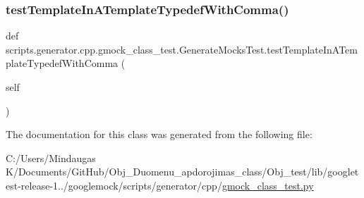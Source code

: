 \subsubsection{\texorpdfstring{testTemplateInATemplateTypedefWithComma()}{testTemplateInATemplateTypedefWithComma()}}
{\footnotesize\ttfamily def scripts.\+generator.\+cpp.\+gmock\+\_\+class\+\_\+test.\+Generate\+Mocks\+Test.\+test\+Template\+In\+A\+Template\+Typedef\+With\+Comma (\begin{DoxyParamCaption}\item[{}]{self }\end{DoxyParamCaption})}



The documentation for this class was generated from the following file\+:\begin{DoxyCompactItemize}
\item 
C\+:/\+Users/\+Mindaugas K/\+Documents/\+Git\+Hub/\+Obj\+\_\+\+Duomenu\+\_\+apdorojimas\+\_\+class/\+Obj\+\_\+test/lib/googletest-\/release-\/1../googlemock/scripts/generator/cpp/\mbox{\hyperlink{_obj__test_2lib_2googletest-release-1_88_81_2googlemock_2scripts_2generator_2cpp_2gmock__class__test_8py}{gmock\+\_\+class\+\_\+test.\+py}}\end{DoxyCompactItemize}
